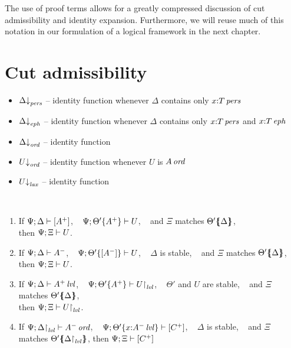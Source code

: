 The use of proof terms allows for a greatly compressed discussion of
cut admissibility and identity expansion. Furthermore, we will reuse
much of this notation in our formulation of a logical framework in the
next chapter. 

\section{Cut admissibility}

\begin{itemize}
\item $\Delta{\downarrow}_{{\it pers}}$ -- identity function whenever $\Delta$ contains only $x{:}{T}\,{{\it pers}}$
\item $\Delta{\downarrow}_{{\it eph}}$ -- identity function whenever $\Delta$ contains only $x{:}{T}\,{{\it pers}}$ and $x{:}{T}\,{{\it eph}}$
\item $\Delta{\downarrow}_{{\it ord}}$ -- identity function
\end{itemize}

\begin{itemize}
\item $U{\downarrow}_{{\it ord}}$ -- identity function whenever $U$ is ${A}\,{{\it ord}}$
\item $U{\downarrow}_{{\it lax}}$ -- identity function
\end{itemize}






\begin{theorem}~
\begin{enumerate}
\item If ${\Psi};{\Delta} \vdash {[ A^+ ]}$, ~
         ${\Psi};{{\Theta'}\{{A^+}\}} \vdash {U}$, ~ and
         $\Xi$ matches ${\Theta'}\mbox{$\{\hspace{-4pt}\{$}{{\Delta}}\mbox{$\}\hspace{-4pt}\}$}$,\\
      then ${\Psi};{\Xi} \vdash {U}$.
\item If ${\Psi};{\Delta} \vdash {A^-}$, ~
         ${\Psi};{{\Theta'}\{{[A^-]}\}} \vdash {U}$, ~
         $\Delta$ is stable, ~ and
         $\Xi$ matches ${\Theta'}\mbox{$\{\hspace{-4pt}\{$}{\Delta}\mbox{$\}\hspace{-4pt}\}$}$,\\
      then ${\Psi};{\Xi} \vdash {U}$.
\item If ${\Psi};{\Delta} \vdash {{A^+}\,{{\it lvl}}}$, ~
         ${\Psi};{{\Theta'}\{{A^+}\}} \vdash {\ensuremath{{U}{\upharpoonright}_{{\it lvl}}}}$, ~
         $\Theta'$ and $U$ are stable, ~ and
         $\Xi$ matches ${\Theta'}\mbox{$\{\hspace{-4pt}\{$}{\Delta}\mbox{$\}\hspace{-4pt}\}$}$,\\
      then ${\Psi};{\Xi} \vdash {\ensuremath{{U}{\upharpoonright}_{{\it lvl}}}}$.
\item If ${\Psi};{{\Delta}{\upharpoonright}_{{\it lvl}}} \vdash {{A^-}\,{{\it ord}}}$, ~
         ${\Psi};{{\Theta'}\{{x{:}{A^-}\,{{\it lvl}}}\}} \vdash [{C^+}]$, ~
         $\Delta$ is stable, ~ and
         $\Xi$ matches ${\Theta'}\mbox{$\{\hspace{-4pt}\{$}{\ensuremath{{\Delta}{\upharpoonright}_{{\it lvl}}}}\mbox{$\}\hspace{-4pt}\}$}$,
      then ${\Psi};{\Xi} \vdash [{C^+}]$
\end{enumerate}
\end{theorem}

